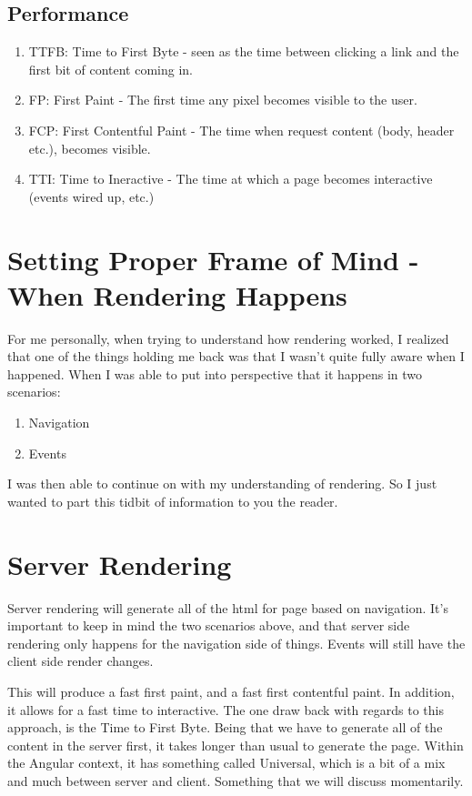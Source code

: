 \subsection{Performance}
\begin{enumerate}
  \item TTFB: Time to First Byte - seen as the time between clicking a link and the first bit of content coming in.
  \item FP: First Paint - The first time any pixel becomes visible to the user.
  \item FCP: First Contentful Paint - The time when request content (body, header etc.), becomes visible. 
  \item TTI: Time to Ineractive - The time at which a page becomes interactive (events wired up, etc.)
\end{enumerate}

\section{ Setting Proper Frame of Mind - When Rendering Happens }
For me personally, when trying to understand how rendering worked, I realized that one of the things holding me back was that I wasn't quite fully aware when I happened. When I was able to put into perspective that it happens in two scenarios: 
\begin{enumerate}
  \item Navigation 
  \item Events
\end{enumerate}

I was then able to continue on with my understanding of rendering. So I just wanted to part this tidbit of information to you the reader.

\section{Server Rendering}
Server rendering will generate all of the html for page based on navigation. It's important to keep in mind the two scenarios above, and that server side rendering only happens for the navigation side of things. Events will still have the client side render changes. 

This will produce a fast first paint, and a fast first contentful paint. In addition, it allows for a fast time to interactive. The one draw back with regards to this approach, is the Time to First Byte. Being that we have to generate all of the content in the server first, it takes longer than usual to generate the page. Within the Angular context, it has something called Universal, which is a bit of a mix and much between server and client. Something that we will discuss momentarily. 

